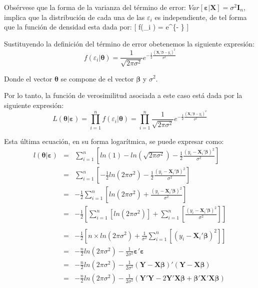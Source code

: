 \documentclass[
  a4paper,
]{article}
\begin{document}
Obsérvese que la forma de la varianza del término de error:
\(Var[\boldsymbol \varepsilon | \mathbf X] = \sigma^2 \mathbf{I}_n\),
implica que la distribución de cada una de las \(\varepsilon_i\) es
independiente, de tel forma que la función de densidad esta dada por:
{[} f(\varepsilon\_i \textbar{} \boldsymbol \theta) =
e\^{}\{-
\} {]}

Sustituyendo la definición del término de error obetenemos la siguiente
expresión: \[
f(\varepsilon_i | \boldsymbol \theta) = \frac{1}{\sqrt{2 \pi \sigma^2}}e^{-\frac{1}{2} \frac{(\mathbf{X}_i'\boldsymbol \beta - y_i)^2}{\sigma^2}}
\]

Donde el vector \(\boldsymbol \theta\) se compone de el vector
\(\boldsymbol \beta\) y \(\sigma^2\).

Por lo tanto, la función de verosimilitud asociada a este caso está dada
por la siguiente expresión: \[
L(\boldsymbol{\theta} | \boldsymbol{\varepsilon}) = \prod_{i=1}^n f(\varepsilon_i|\boldsymbol{\theta}) = \prod_{i=1}^n\frac{1}{\sqrt{2 \pi \sigma^2}}e^{-\frac{1}{2} \frac{(\mathbf{X}_i'\boldsymbol \beta - y_i)^2}{\sigma^2}}
\]

Esta última ecuación, en su forma logarítmica, se puede expresar como:
\begin{eqnarray}
l(\boldsymbol{\theta} | \boldsymbol{\varepsilon}) 
& = &
\sum_{i=1}^n{ \left[ ln(1) - ln(\sqrt{2 \pi \sigma^2}) - \frac{1}{2} \frac{(y_i - \mathbf{X}_i'\boldsymbol \beta)^2}{\sigma^2} \right]} \nonumber \\
 & = &
\sum_{i=1}^n{ \left[- \frac{1}{2}ln(2 \pi \sigma^2) - \frac{1}{2} \frac{(y_i - \mathbf{X}_i'\boldsymbol \beta)^2}{\sigma^2} \right]} \nonumber \\
 & = &
- \frac{1}{2} \sum_{i=1}^n{ \left[ln(2 \pi \sigma^2) + \frac{(y_i - \mathbf{X}_i'\boldsymbol \beta)^2}{\sigma^2} \right]} \nonumber \\
 & = &
- \frac{1}{2} \left[ \sum_{i=1}^n{ \left[ln(2 \pi \sigma^2) \right]} + \sum_{i=1}^n{ \left[\frac{(y_i - \mathbf{X}_i'\boldsymbol \beta)^2}{\sigma^2} \right]} \right] \nonumber \\\nonumber \\
 & = &
- \frac{1}{2} \left[ n \times ln(2 \pi \sigma^2) + \frac{1}{\sigma^2} \sum_{i=1}^n{ \left[(y_i - \mathbf{X}_i'\boldsymbol \beta)^2\right]} \right] \nonumber \\
 & = &
- \frac{n}{2}ln(2 \pi \sigma^2) - \frac{1}{2 \sigma^2} \boldsymbol \varepsilon' \boldsymbol \varepsilon \nonumber \\
 & = &
- \frac{n}{2}ln(2 \pi \sigma^2) - \frac{1}{2 \sigma^2} (\mathbf{Y} - \mathbf{X} \boldsymbol \beta)'(\mathbf{Y} - \mathbf{X} \boldsymbol \beta) \nonumber \\
 & = &
- \frac{n}{2}ln(2 \pi \sigma^2) - \frac{1}{2 \sigma^2} (\mathbf{Y'Y} - 2\mathbf{Y'X} \boldsymbol \beta + \boldsymbol \beta' \mathbf{X'X} \boldsymbol \beta)
\end{eqnarray}
\end{document}

